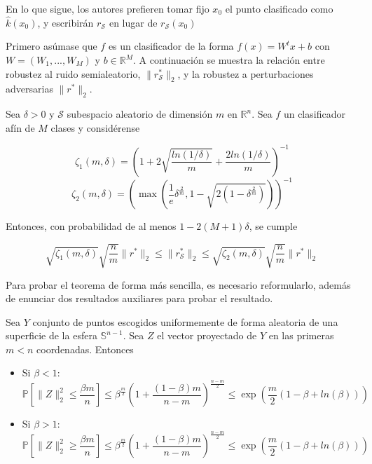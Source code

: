 En lo que sigue, los autores prefieren tomar fijo $x_0$ el punto clasificado como $\widehat{k}(x_0)$, y escribirán $r_\mathcal{S}$ en lugar de $r_{\mathcal{S}}(x_0)$

Primero asúmase que $f$ es un clasificador de la forma $f(x)=W^{t}x+b$ con $W=(W_1,...,W_M)$ y $b \in \mathbb{R}^M$. A continuación se muestra la relación entre robustez al ruido semialeatorio, $\|r_\mathcal{S}^* \|_2$, y la robustez a perturbaciones adversarias $\|r^* \|_2$.

\begin{teorema} \label{teom222}
Sea $\delta > 0$ y $\mathcal{S}$ subespacio aleatorio de dimensión $m$ en $\mathbb{R}^n$. Sea $f$ un clasificador afín de $M$ clases y considérense

$$\zeta_1 (m,\delta)= \left( 1 + 2 \sqrt{\frac{ln(1/\delta)}{m}} + \frac{2 ln(1/\delta)}{m} \right)^{-1}$$
$$\zeta_2 (m,\delta) = \left( \max \left( \frac{1}{e} \delta^{\frac{2}{m}},1 - \sqrt{2(1-\delta^{\frac{2}{m}})} \right) \right)^{-1}$$

Entonces, con probabilidad de al menos $1-2(M+1) \delta$, se cumple

$$\sqrt{\zeta_1 (m,\delta)} \sqrt{\frac{n}{m}} \|r^* \|_2 \leq \|r_\mathcal{S}^* \|_2 \leq \sqrt{\zeta_2 (m,\delta)} \sqrt{\frac{n}{m}} \|r^*\|_2$$

\end{teorema}

Para probar el teorema de forma más sencilla, es necesario reformularlo, además de enunciar dos resultados auxiliares para probar el resultado.

\begin{lema}
Sea $Y$ conjunto de puntos escogidos uniformemente de forma aleatoria de una superficie de la esfera $\mathbb{S}^{n-1}$. Sea $Z$ el vector proyectado de $Y$ en las primeras $m<n$ coordenadas. Entonces

\begin{itemize}
	\item Si $\beta < 1$:
	$$\mathbb{P} \left[ \|Z \|_2^2 \leq \frac{\beta m}{n} \right] \leq \beta^{\frac{m}{2}} \left( 1 + \frac{(1-\beta)m}{n-m} \right)^{\frac{n-m}{2}} \leq \exp \left( \frac{m}{2}(1-\beta+ln(\beta)) \right)$$
	\item Si $\beta > 1$:
	$$\mathbb{P} \left[ \|Z \|_2^2 \geq \frac{\beta m}{n} \right] \leq \beta^{\frac{m}{2}} \left( 1 + \frac{(1-\beta)m}{n-m} \right)^{\frac{n-m}{2}} \leq \exp \left( \frac{m}{2} (1-\beta+ln(\beta)) \right)$$
\end{itemize}
\end{lema}

